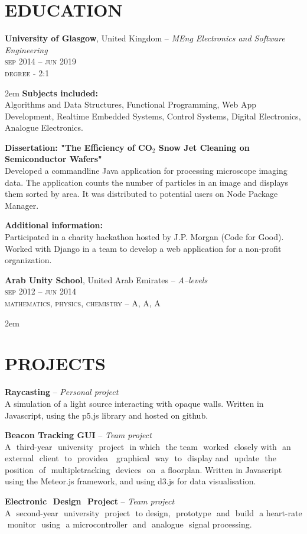 \documentclass[paper=a4,fontsize=11pt]{scrartcl} %
\newcommand{\sepspace}{\vspace*{1em}}		%
\newcommand{\NewPart}[1]{\section*{\uppercase{\textcolor{PARTCOLOR}{#1}}}}
\newcommand{\EducationEntry}[7]{
	\noindent
	\textbf{#1}, #2 -- \textit{#3}\\
	\textsc{#4 -- #5} \\
	\textcolor{DESCOLOR}{\textsc{#6}}\\
	\begin{addmargin}[1em]{2em}
	#7
	\end{addmargin}
}
\newcommand{\ProjectEntry}[3]{
	\noindent
	\textbf{#1} -- \textit{#2} \\
	\textcolor{DESCOLOR}{#3}
	\sepspace
}
\begin{document}
\NewPart{Education}
\EducationEntry{University of Glasgow}{United Kingdom}{MEng Electronics and Software Engineering}{sep 2014}{jun 2019}{degree - 2:1}
{\noindent \textbf{Subjects included:}\\ Algorithms and Data Structures, Functional Programming, Web App Development, Realtime Embedded Systems, Control Systems, Digital Electronics, Analogue Electronics.\par
\vskip 10pt
\noindent \textbf{Dissertation: "The Efficiency of CO$_2$ Snow Jet Cleaning on Semiconductor Wafers"}\\ Developed a commandline Java application for processing microscope imaging data. The application counts the number of particles in an image and displays them sorted by area. It was distributed to potential users on Node Package Manager.\par
\vskip 10pt
\noindent \textbf{Additional information:}\\ Participated in a charity hackathon hosted by J.P. Morgan (Code for Good). Worked with Django in a team to develop a web application for a non-profit organization.\par}

\vskip 35pt

\EducationEntry{Arab Unity School}{United Arab Emirates}{A--levels}{sep 2012}{jun 2014}{mathematics, physics, chemistry -- A, A, A}{ }

\NewPart{Projects}
\ProjectEntry{Raycasting}{Personal project}{A simulation of a light source interacting with opaque walls. Written in Javascript, using the p5.js library and hosted on github.}

\ProjectEntry{Beacon​ Tracking​ GUI​}{Team project}{A​ ​ third-year​ ​ university​ ​ project​ ​ in​ ​ which​ ​ the team ​ worked​ ​ closely
with​ ​ an​ ​ external​ ​ client​ ​ to​ ​ provide​ ​ a ​ ​ graphical​ ​ way​ ​ to​ ​ display and​ ​ update​ ​ the​ ​ position​ ​ of​ ​ multiple​ ​ tracking​ ​ devices​ ​ on​ ​ a floorplan. Written in Javascript using the Meteor.js framework, and using d3.js for data visualisation.}

\ProjectEntry{Electronic​ ​ Design​ ​ Project}{Team project}{A​ ​ second-year​ ​ university​ ​ project​ ​ to​ ​ design,​ ​ prototype​ ​ and​ ​ build​ ​ a heart-rate​ ​ monitor​ ​ using​ ​ a ​ ​microcontroller​ ​ and​ ​ analogue​ ​ signal processing.}
\end{document}
